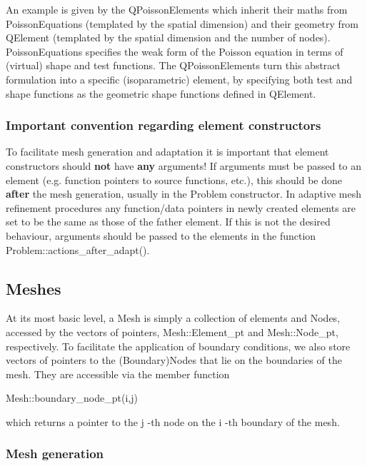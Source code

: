 An example is given by the {\ttfamily Q\+Poisson\+Elements} which inherit their maths from {\ttfamily Poisson\+Equations} (templated by the spatial dimension) and their geometry from {\ttfamily Q\+Element} (templated by the spatial dimension and the number of nodes). {\ttfamily Poisson\+Equations} specifies the weak form of the Poisson equation in terms of (virtual) shape and test functions. The {\ttfamily Q\+Poisson\+Elements} turn this abstract formulation into a specific (isoparametric) element, by specifying both test and shape functions as the geometric shape functions defined in {\ttfamily Q\+Element}.\hypertarget{index_no_args_for_element_constructors}{}\subsubsection{Important convention regarding element constructors}\label{index_no_args_for_element_constructors}
To facilitate mesh generation and adaptation it is important that element constructors should {\bfseries not} have {\bfseries any} arguments! If arguments must be passed to an element (e.\+g. function pointers to source functions, etc.), this should be done {\bfseries after} the mesh generation, usually in the {\ttfamily Problem} constructor. In adaptive mesh refinement procedures any function/data pointers in newly created elements are set to be the same as those of the father element. If this is not the desired behaviour, arguments should be passed to the elements in the function {\ttfamily Problem\+::actions\+\_\+after\+\_\+adapt()}.\hypertarget{index_meshes}{}\subsection{Meshes}\label{index_meshes}
At its most basic level, a {\ttfamily Mesh} is simply a collection of elements and {\ttfamily Nodes}, accessed by the vectors of pointers, {\ttfamily Mesh\+::\+Element\+\_\+pt} and {\ttfamily Mesh\+::\+Node\+\_\+pt}, respectively. To facilitate the application of boundary conditions, we also store vectors of pointers to the ({\ttfamily Boundary}){\ttfamily Nodes} that lie on the boundaries of the mesh. They are accessible via the member function 
\begin{DoxyCode}
Mesh::boundary\_node\_pt(i,j) 
\end{DoxyCode}
 which returns a pointer to the {\ttfamily j} -\/th node on the {\ttfamily i} -\/th boundary of the mesh.\hypertarget{index_Mesh_generation}{}\subsubsection{Mesh generation}\label{index_Mesh_generation}
